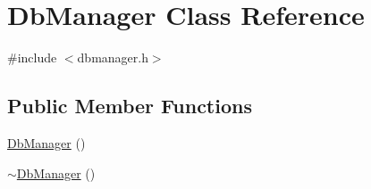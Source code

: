 \hypertarget{classDbManager}{}\section{Db\+Manager Class Reference}
\label{classDbManager}


{\ttfamily \#include $<$dbmanager.\+h$>$}

\subsection*{Public Member Functions}
\begin{DoxyCompactItemize}
\item 
\hyperlink{classDbManager_a0d16cf5bba931362e6c581eb1b5ba66a}{Db\+Manager} ()
\item 
\hyperlink{classDbManager_ac5cdf8e5e932d1681ab807d8f256374c}{$\sim$\+Db\+Manager} ()
\end{DoxyCompactItemize}
